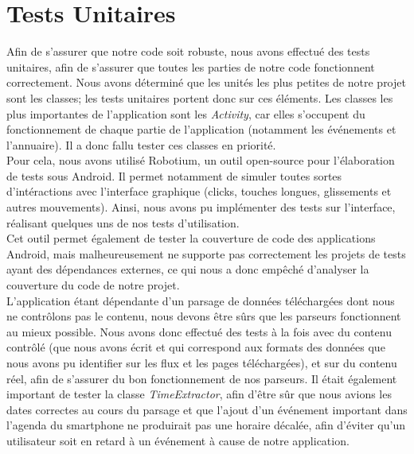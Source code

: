 \section{Tests Unitaires}
Afin de s'assurer que notre code soit robuste, nous avons effectué des tests unitaires, afin de s'assurer que toutes les parties de notre code fonctionnent correctement. Nous avons déterminé que les unités les plus petites de notre projet sont les classes; les tests unitaires portent donc sur ces éléments. Les classes les plus importantes de l’application sont les \emph{Activity}, car elles s’occupent du fonctionnement de chaque partie de l’application (notamment les événements et l'annuaire). Il a donc fallu tester ces classes en priorité.\\
Pour cela, nous avons utilisé Robotium, un outil open-source pour l'élaboration de tests sous Android. Il permet notamment de simuler toutes sortes d'intéractions avec l'interface graphique (clicks, touches longues, glissements et autres mouvements). Ainsi, nous avons pu implémenter des tests sur l'interface, réalisant quelques uns de nos tests d'utilisation.\\
Cet outil permet également de tester la couverture de code des applications Android, mais malheureusement ne supporte pas correctement les projets de tests ayant des dépendances externes, ce qui nous a donc empêché d'analyser la couverture du code de notre projet.\\

L'application étant dépendante d'un parsage de données téléchargées dont nous ne contrôlons pas le contenu, nous devons être sûrs que les parseurs fonctionnent au mieux possible. Nous avons donc effectué des tests à la fois avec du contenu contrôlé (que nous avons écrit et qui correspond aux formats des données que nous avons pu identifier sur les flux et les pages téléchargées), et sur du contenu réel, afin de s'assurer du bon fonctionnement de nos parseurs.
Il était également important de tester la classe \emph{TimeExtractor}, afin d'être sûr que nous avions les dates correctes au cours du parsage et que l'ajout d'un événement important dans l'agenda du smartphone ne produirait pas une horaire décalée, afin d'éviter qu'un utilisateur soit en retard à un événement à cause de notre application.
